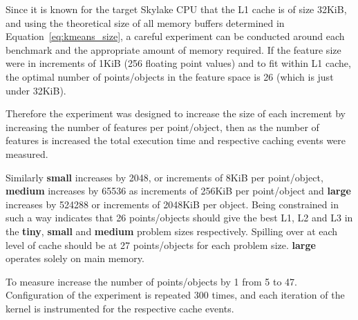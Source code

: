 \documentclass[../document.tex]{subfiles}
\begin{document}
Since it is known for the target Skylake CPU that the L1 cache is of size 32KiB, and using the theoretical size of all memory buffers determined in Equation~\ref{eq:kmeans_size}, a careful experiment can be conducted around each benchmark and the appropriate amount of memory required.
If the feature size were in increments of 1KiB (256 floating point values) and to fit within L1 cache, the optimal number of points/objects in the feature space is 26 (which is just under 32KiB).

Therefore the experiment was designed to increase the size of each increment by increasing the number of features per point/object, then as the number of features is increased the total execution time and respective caching events were measured.

Similarly {\bf small} increases by 2048, or increments of 8KiB per point/object, {\bf medium} increases by 65536 as increments of 256KiB per point/object and {\bf large} increases by 524288 or increments of 2048KiB per object.
Being constrained in such a way indicates that 26 points/objects should give the best L1, L2 and L3 in the {\bf tiny}, {\bf small} and {\bf medium} problem sizes respectively.
Spilling over at each level of cache should be at 27 points/objects for each problem size.
{\bf large} operates solely on main memory.

To measure increase the number of points/objects by 1 from 5 to 47.
Configuration of the experiment is repeated 300 times, and each iteration of the kernel is instrumented for the respective cache events.

\end{document}
